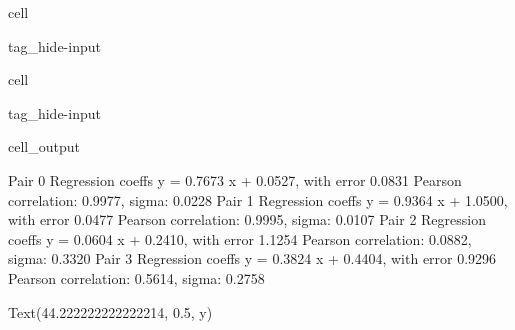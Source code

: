 \documentclass[letterpaper,10pt,italian]{jupyterBook}
\begin{document}
\begin{sphinxuseclass}{cell}
\begin{sphinxuseclass}{tag_hide-input}
\end{sphinxuseclass}
\end{sphinxuseclass}
\begin{sphinxuseclass}{cell}
\begin{sphinxuseclass}{tag_hide-input}\begin{sphinxVerbatimOutput}

\begin{sphinxuseclass}{cell_output}
\begin{sphinxVerbatim}[commandchars=\\\{\}]
\PYGZgt{} Pair 0
  Regression coeffs y = 0.7673 x + 0.0527, with error 0.0831
  Pearson correlation: 0.9977, sigma: 0.0228
\PYGZgt{} Pair 1
  Regression coeffs y = \PYGZhy{}0.9364 x + 1.0500, with error 0.0477
  Pearson correlation: \PYGZhy{}0.9995, sigma: 0.0107
\PYGZgt{} Pair 2
  Regression coeffs y = \PYGZhy{}0.0604 x + 0.2410, with error 1.1254
  Pearson correlation: \PYGZhy{}0.0882, sigma: 0.3320
\PYGZgt{} Pair 3
  Regression coeffs y = 0.3824 x + 0.4404, with error 0.9296
  Pearson correlation: 0.5614, sigma: 0.2758
\end{sphinxVerbatim}

\begin{sphinxVerbatim}[commandchars=\\\{\}]
Text(44.222222222222214, 0.5, \PYGZsq{}y\PYGZsq{})
\end{sphinxVerbatim}

\noindent{}

\end{sphinxuseclass}\end{sphinxVerbatimOutput}

\end{sphinxuseclass}
\end{sphinxuseclass}
\sphinxstepscope
\end{document}
